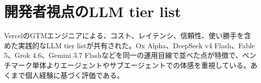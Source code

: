 \section{開発者視点のLLM tier list}
VercelのGTMエンジニアによる、コスト、レイテンシ、信頼性、使い勝手を含めた実践的なLLM tier listが共有された。Ox Alpha、DeepSeek v4 Flash、Fable 5、Grok 4.6、Gemini 3.7 Flashなどを同一の運用目線で並べた点が特徴で、ベンチマーク単体よりエージェントやサブエージェントでの体感を重視している。あくまで個人経験に基づく評価である。
